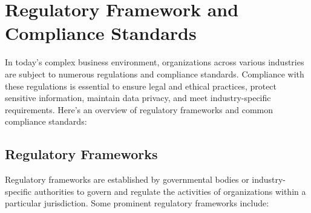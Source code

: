 \chapter*{Regulatory Framework and Compliance Standards}

In today's complex business environment, organizations across various industries are subject to numerous regulations and compliance standards. Compliance with these regulations is essential to ensure legal and ethical practices, protect sensitive information, maintain data privacy, and meet industry-specific requirements. Here's an overview of regulatory frameworks and common compliance standards:


\section*{Regulatory Frameworks}

Regulatory frameworks are established by governmental bodies or industry-specific authorities to govern and regulate the activities of organizations within a particular jurisdiction. Some prominent regulatory frameworks include:

